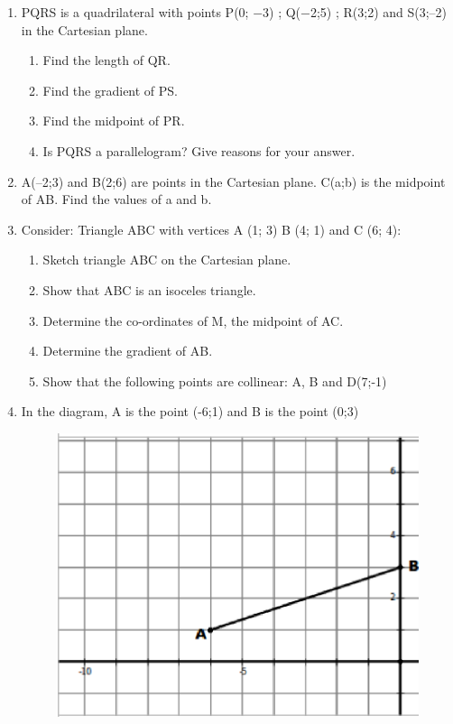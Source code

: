 \begin{enumerate}[noitemsep, label=\textbf{\arabic*}. ]
\begin{enumerate}[noitemsep, label=\textbf{\alph*}. ]
\begin{figure}[H]
\begin{center}
    \vspace{.1in}
    \end{center}
 \end{figure}       \end{enumerate}
                \item  
PQRS is a quadrilateral with points P(0; −3) ; Q(−2;5) ; R(3;2) and S(3;--2)  in the Cartesian plane.
\label{m39358*id0812312}\begin{enumerate}[noitemsep, label=\textbf{\alph*}. ] 
            \label{m39358*id08123}\item Find the length of QR.\label{m39358*id981221}\item Find the gradient of PS.\label{m39358*id08213}\item Find the midpoint of PR.\label{m39358*id9871293}\item Is PQRS a parallelogram?  Give reasons for your answer. \end{enumerate}
                \item A(--2;3) and B(2;6) are points in the Cartesian plane.  C(a;b) is the midpoint of AB. Find the values of a and b.\newline
\item 
Consider: Triangle ABC with vertices A (1; 3) B (4; 1) and C (6; 4):
\label{m39358*id9173123}\begin{enumerate}[noitemsep, label=\textbf{\alph*}. ] 
            \item Sketch triangle ABC on the Cartesian plane. \item Show that ABC is an isoceles triangle.\item Determine the co-ordinates of M, the midpoint of AC.\item Determine the gradient of AB.\item Show that the following points are collinear: A, B and D(7;-1)\end{enumerate}
\item In the diagram, A is the point (-6;1) and B is the point (0;3)
    \setcounter{subfigure}{0}
	\begin{figure}[H] %
    \begin{center}
    \label{m39358*id740344!!!underscore!!!media}\label{m39358*id740344!!!underscore!!!printimage}\includegraphics[width=.7\columnwidth]{col11306.imgs/m39358_MG10C14_5.png} %

\end{center}
\end{figure}
\end{enumerate}
